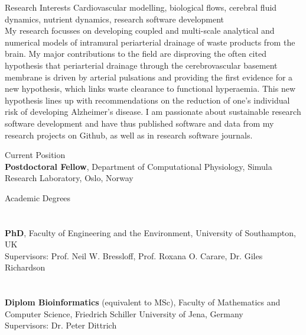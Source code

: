 \documentclass[margin,line,10pt]{res}
\begin{document}

\address{alexandra.diem@gmail.com, \url{https://www.akdiem.com}, \url{https://github.com/akdiem}}

\begin{resume}

{\sc Research Interests} Cardiovascular modelling, biological flows, cerebral fluid dynamics, nutrient dynamics, research software development\\

My research focusses on developing coupled and multi-scale analytical and numerical models of intramural periarterial drainage of waste products from the brain. My major contributions to the field are disproving the often cited hypothesis that periarterial drainage through the cerebrovascular basement membrane is driven by arterial pulsations and providing the first evidence for a new hypothesis, which links waste clearance to functional hyperaemia. This new hypothesis lines up with recommendations on the reduction of one's individual risk of developing Alzheimer's disease. I am passionate about sustainable research software development and have thus published software and data from my research projects on Github, as well as in research software journals.\\ 
  
\vspace*{-.2in}

{\sc Current Position}\\
{\bf Postdoctoral Fellow}, Department of Computational Physiology, Simula Research Laboratory, Oslo, Norway\\

\vspace*{-.2in}

{\sc Academic Degrees}\\
\vspace*{-.35in}
\section{}{\bf PhD}, Faculty of Engineering and the Environment, University of Southampton, UK\\
Supervisors: Prof. Neil W. Bressloff, Prof. Roxana O. Carare, Dr. Giles Richardson\\
\vspace*{-.35in}
\section{}{\bf Diplom Bioinformatics} (equivalent to MSc), Faculty of Mathematics and Computer Science, Friedrich Schiller University of Jena, Germany\\
Supervisors: Dr. Peter Dittrich\\


\end{resume}
\end{document}
